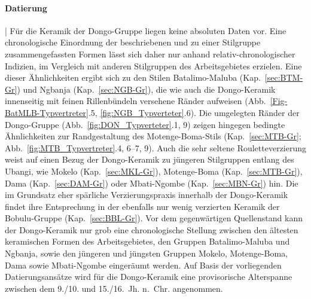 \paragraph{Datierung}\hspace{-.5em}|\hspace{.5em}%
Für die Keramik der Dongo-Gruppe liegen keine absoluten Daten vor. Eine chronologische Einordnung der beschriebenen und zu einer Stilgruppe zusammengefassten Formen lässt sich daher nur anhand relativ-chronologischer Indizien, im Vergleich mit anderen Stilgruppen des Arbeitsgebietes erzielen. Eine dieser Ähnlichkeiten ergibt sich zu den Stilen Batalimo-Maluba (Kap.~\ref{sec:BTM-Gr}) und \mbox{Ngbanja} (Kap.~\ref{sec:NGB-Gr}), die wie auch die Dongo-Keramik innenseitig mit feinen Rillenbündeln versehene Ränder aufweisen (Abb.~\ref{Fig-BatMLB-Typvertreter}.5, \ref{fig:NGB_Typverteter}.6). Die umgelegten Ränder der Dongo-Gruppe (Abb.~\ref{fig:DON_Typverteter}.1, 9) zeigen hingegen bedingte Ähnlichkeiten zur Randgestaltung des Motenge-Boma-Stils (Kap.~\ref{sec:MTB-Gr}; Abb.~\ref{fig:MTB_Typvertreter}.4, 6--7, 9). Auch die sehr seltene Rouletteverzierung weist auf einen Bezug der Dongo-Keramik zu jüngeren Stilgruppen entlang des \mbox{Ubangi}, wie Mokelo (Kap.~\ref{sec:MKL-Gr}), Motenge-Boma (Kap.~\ref{sec:MTB-Gr}), Dama (Kap.~\ref{sec:DAM-Gr}) oder Mbati-Ngombe (Kap.~\ref{sec:MBN-Gr}) hin. Die im Grundsatz eher spärliche Verzierungspraxis innerhalb der Dongo-Keramik findet ihre Entsprechung in der ebenfalls nur wenig verzierten Keramik der Bobulu-Gruppe (Kap.~\ref{sec:BBL-Gr}). Vor dem gegenwärtigen Quellenstand kann der Dongo-Keramik nur grob eine chronologische Stellung zwischen den ältesten keramischen Formen des Arbeitsgebietes, den Gruppen Batalimo-Maluba und \mbox{Ngbanja}, sowie den jüngeren und jüngsten Gruppen Mokelo, Motenge-Boma, Dama sowie Mbati-Ngombe eingeräumt werden. Auf Basis der vorliegenden Datierungsansätze wird für die Dongo-Keramik eine provisorische Alterspanne zwischen dem 9./10. und 15./16.~Jh. n.~Chr. angenommen.


